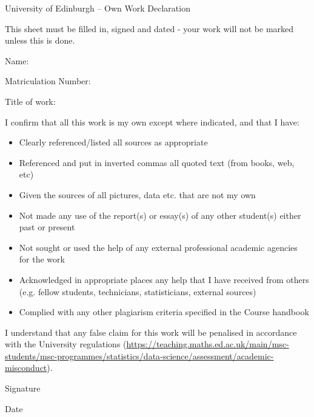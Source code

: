 \documentclass[11pt,twoside]{article}
\numberwithin{Theorem}{section}
\numberwithin{Definition}{section}
\numberwithin{Lemma}{section}
\numberwithin{Algorithm}{section}
\numberwithin{equation}{section}
\newcommand{\dottedline}[1]{\makebox[#1]{.\dotfill}}
\begin{document}
\clearpage

\begin{center}
\Large{University of Edinburgh – Own Work Declaration}
\end{center}


This sheet must be filled in, signed and dated - your work will not be marked unless this is done.
\vspace{1cm}

Name: \dottedline{8cm}

Matriculation Number: \dottedline{6cm}

Title of work: \dottedline{8cm}

\vspace{1cm}

I confirm that all this work is my own except where indicated, and that I have:
\begin{itemize}
\item	Clearly referenced/listed all sources as appropriate	 				
\item	Referenced and put in inverted commas all quoted text (from books, web, etc)	
\item	Given the sources of all pictures, data etc. that are not my own				
\item	Not made any use of the report(s) or essay(s) of any other student(s) either past 	
or present	
\item	Not sought or used the help of any external professional academic agencies for the work
\item	Acknowledged in appropriate places any help that I have received from others	(e.g. fellow students, technicians, statisticians, external sources)
\item	Complied with any other plagiarism criteria specified in the Course handbook
\end{itemize}

I understand that any false claim for this work will be penalised in accordance with
the University regulations	(\url{https://teaching.maths.ed.ac.uk/main/msc-students/msc-programmes/statistics/data-science/assessment/academic-misconduct}).								

\vspace{1cm}

Signature \dottedline{8cm}

\vspace{5mm}

Date \dottedline{8cm}


\clearpage
\end{document}
